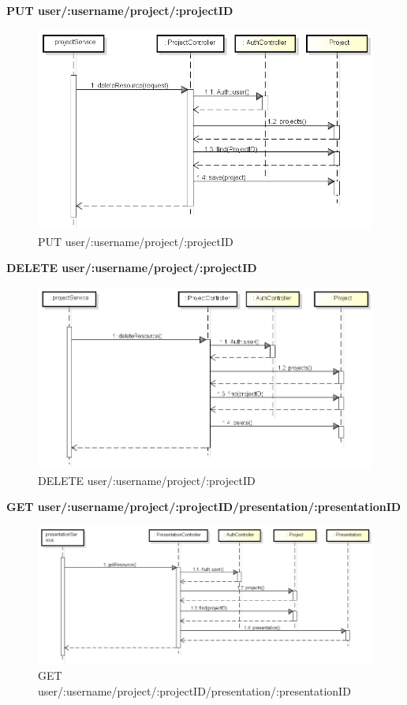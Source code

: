 \newpage

\textbf{PUT user/:username/project/:projectID}
	\begin{figure}[h]
		\centering
		\includegraphics[width=0.6\linewidth]{img/PUT_project}
		\caption[PUT user/:username/project/:projectID]{PUT user/:username/project/:projectID}
		\label{fig:PUT user/:username/project/projectID}
	\end{figure}

\textbf{DELETE user/:username/project/:projectID}
	\begin{figure}[h]
		\centering
		\includegraphics[width=0.6\linewidth]{img/DELETE_project}
		\caption[DELETE user/:username/project/:projectID]{DELETE user/:username/project/:projectID}
		\label{fig:DELETE user/:username/project/:projectID}
	\end{figure}
	
\newpage

\textbf{GET user/:username/project/:projectID/presentation/:presentationID}
\begin{figure}[h]
	\centering
	\includegraphics[width=0.6\linewidth]{img/GETpresentation}
	\caption[GET user/:username/project/:projectID/presentation/:presentationID]{GET user/:username/project/:projectID/presentation/:presentationID}
	\label{fig:GET user/:username/project/projectID/presentation/:presentationID}
\end{figure}

